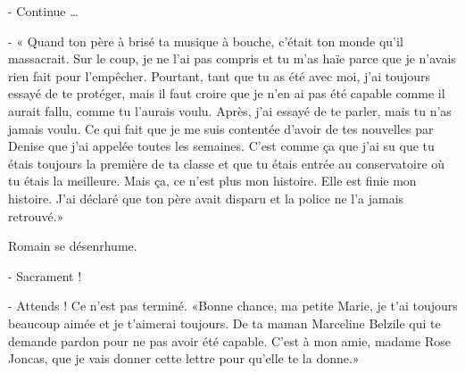 - Continue …

- « Quand ton père à brisé ta musique à bouche, c’était ton monde qu’il massacrait. Sur le coup, je ne l’ai pas compris et tu m’as haïe parce que je n’avais rien fait pour l’empêcher. Pourtant, tant que tu as été avec moi, j’ai toujours essayé de te protéger, mais il faut croire que je n’en ai pas été capable comme il aurait fallu, comme tu l’aurais voulu. Après, j’ai essayé de te parler, mais tu n’as jamais voulu. Ce qui fait que je me suis contentée d’avoir de tes nouvelles par Denise que j’ai appelée toutes les semaines. C’est comme ça que j’ai su que tu étais toujours la première de ta classe et que tu étais entrée au conservatoire où tu étais la meilleure. Mais ça, ce n’est plus mon histoire. Elle est finie mon histoire. J’ai déclaré que ton père avait disparu et la police ne l’a jamais retrouvé.»

Romain se désenrhume.

- Sacrament !

- Attends ! Ce n’est pas terminé. «Bonne chance, ma petite Marie, je t’ai toujours beaucoup aimée et je t’aimerai toujours. De ta maman Marceline Belzile qui te demande pardon pour ne pas avoir été capable. C’est à mon amie, madame Rose Joncas, que je vais donner cette lettre pour qu’elle te la donne.»
